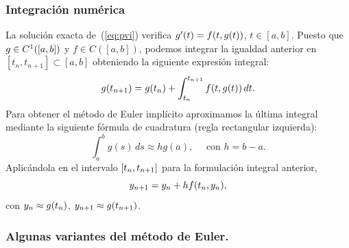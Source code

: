 \subsubsection*{Integración numérica}
La solución exacta de~(\ref{eq:pvi}) verifica $g'(t) = f(t, g(t))$,
$t\in [a,b]$. Puesto que $g\in C^1([a,b])$ y $f\in C([a,b])$,
podemos integrar la igualdad anterior en $[t_n,t_{n+1}] \subset [a,b]$
obteniendo la siguiente expresión integral:
\begin{equation}
  \label{eq:tema4.5}
  g({t_{n+1}}) = g({t_n}) + \int_{t_n}^{t_{n+1}} f(t,g(t))\, dt.
\end{equation}
Para obtener el método de Euler implícito aproximamos la última
integral mediante la siguiente fórmula de cuadratura (regla
rectangular izquierda):
\begin{equation*}
  \int_a^b g(s)\,ds \approx hg(a), \quad \text{ con $h=b-a$}.
\end{equation*}
Aplicándola en el intervalo $[{t_n},{t_{n+1}}]$ para la formulación integral
anterior,
\begin{equation*}
  {y_{n+1}} =  {y_n} + h f({t_n},{y_n}),
\end{equation*}
con ${y_n}\approx g({t_n})$, ${y_{n+1}}\approx g({t_{n+1}})$.

%

\subsubsection*{Algunas variantes del método de Euler.}

